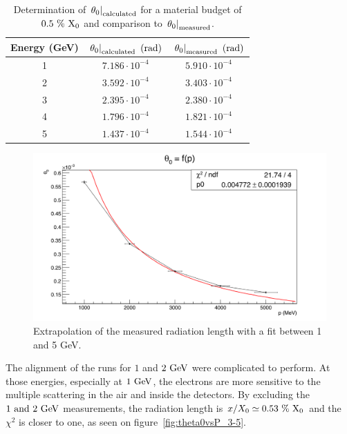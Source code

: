    \begin{table}
     \centering
     \begin{tabular}{c c c}
        \hline %
        Energy (GeV)	& $\left. \theta_0\right|_{\rm{calculated}}~(\rm{rad})$ & $\left. \theta_0\right|_{\rm{measured}}~(\rm{rad})$ \tabularnewline
        \hline %
        \hline %

        	1	  &		$7.186\cdot 10^{-4}$	  &		$5.910\cdot 10^{-4}$	     \tabularnewline
        	2		&		$3.592\cdot 10^{-4}$	  &		$3.403\cdot 10^{-4}$	     \tabularnewline
        	3		&		$2.395\cdot 10^{-4}$	  &		$2.380\cdot 10^{-4}$      \tabularnewline
        	4		&		$1.796\cdot 10^{-4}$	  &	  $1.821\cdot 10^{-4}$       \tabularnewline
        	5		&		$1.437\cdot 10^{-4}$    &		$1.544\cdot 10^{-4}$	     \tabularnewline
     
     \end{tabular}
     \caption{Determination of $\left. \theta_0\right|_{\rm{calculated}}$ for a material budget of $0.5~\%~\rm{X_0}$ and comparison to $\left. \theta_0\right|_{\rm{measured}}$.}
     \label{tab:X0}
   \end{table}

   \begin{figure}[!h]
     \centering
     \includegraphics[width = \textwidth]{Pictures/X0/theta0VsP_all.png}
     \caption{Extrapolation of the measured radiation length with a fit between 1 and 5 GeV.}
     \label{fig:theta0vsP_all}
   \end{figure}

   The alignment of the runs for $1$ and $2~\rm{GeV}$ were complicated to perform.
   At those energies, especially at $1~\rm{GeV}$, the electrons are more sensitive to the multiple scattering in the air and inside the detectors.
   By excluding the $1~\rm{and}~2~\rm{GeV}$ measurements, the radiation length is $x/X_0 \simeq 0.53~\%~\rm{X_{0}}$ and the $\chi^2$ is closer to one, as seen on figure~\ref{fig:theta0vsP_3-5}.
   
